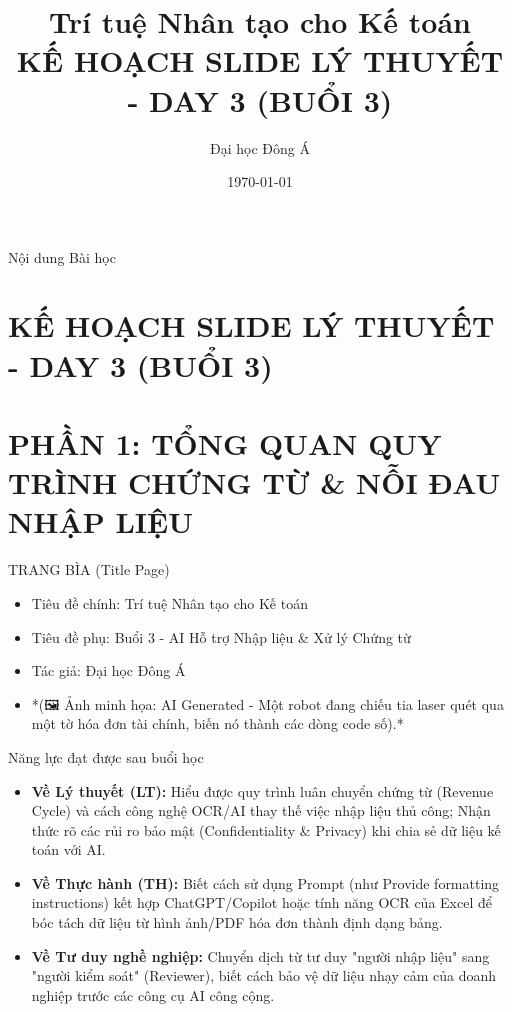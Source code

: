 \documentclass[aspectratio=169]{beamer}
\title[Trí tuệ Nhân tạo cho Kế toán]{Trí tuệ Nhân tạo cho Kế toán \\ \vspace{0.3cm} \Large KẾ HOẠCH SLIDE LÝ THUYẾT - DAY 3 (BUỔI 3)}
\author{Đại học Đông Á}
\date{\today}
\begin{document}
\begin{frame}
    \titlepage
\end{frame}

\begin{frame}{Nội dung Bài học}
    \tableofcontents
\end{frame}


\section{KẾ HOẠCH SLIDE LÝ THUYẾT - DAY 3 (BUỔI 3)}


\section{PHẦN 1: TỔNG QUAN QUY TRÌNH CHỨNG TỪ \& NỖI ĐAU NHẬP LIỆU}


\begin{frame}{TRANG BÌA (Title Page)}
    \begin{itemize}
        \item Tiêu đề chính: Trí tuệ Nhân tạo cho Kế toán
        \item Tiêu đề phụ: Buổi 3 - AI Hỗ trợ Nhập liệu \& Xử lý Chứng từ
        \item Tác giả: Đại học Đông Á
        \item *(🖼️ Ảnh minh họa: AI Generated - Một robot đang chiếu tia laser quét qua một tờ hóa đơn tài chính, biến nó thành các dòng code số).*
    \end{itemize}
\end{frame}


\begin{frame}{Năng lực đạt được sau buổi học}
    \begin{itemize}
        \item \textbf{Về Lý thuyết (LT):} Hiểu được quy trình luân chuyển chứng từ (Revenue Cycle) và cách công nghệ OCR/AI thay thế việc nhập liệu thủ công; Nhận thức rõ các rủi ro bảo mật (Confidentiality \& Privacy) khi chia sẻ dữ liệu kế toán với AI.
        \item \textbf{Về Thực hành (TH):} Biết cách sử dụng Prompt (như Provide formatting instructions) kết hợp ChatGPT/Copilot hoặc tính năng OCR của Excel để bóc tách dữ liệu từ hình ảnh/PDF hóa đơn thành định dạng bảng.
        \item \textbf{Về Tư duy nghề nghiệp:} Chuyển dịch từ tư duy "người nhập liệu" sang "người kiểm soát" (Reviewer), biết cách bảo vệ dữ liệu nhạy cảm của doanh nghiệp trước các công cụ AI công cộng.
    \end{itemize}
\end{frame}
\end{document}
